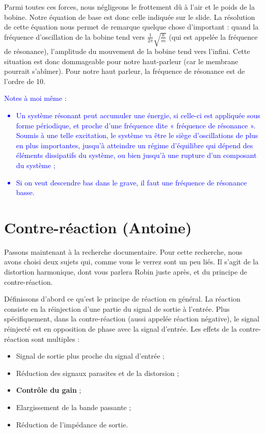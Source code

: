 \documentclass{article}
\begin{document}
Parmi toutes ces forces, nous négligeons le frottement dû à l'air et le poids de la bobine.
Notre équation de base est donc celle indiquée sur le slide. La résolution de cette équation
nous permet de remarque quelque chose d'important : quand la fréquence d'oscillation
de la bobine tend vers $\frac{1}{2\pi} \sqrt{\frac{k}{m}}$ (qui est appelée la fréquence de
résonance), l'amplitude du mouvement de la bobine tend vers l'infini. Cette situation est donc
dommageable pour notre haut-parleur (car le membrane pourrait s'abîmer). Pour notre haut parleur,
la fréquence de résonance est de l'ordre de \unit{10}{\hertz}.

\textcolor{blue}{Notes à moi même : 
\begin{itemize}
	\item Un système résonant peut accumuler une énergie, si celle-ci est appliquée sous
				forme périodique, et proche d'une fréquence dite « fréquence de résonance ». Soumis à une telle
				excitation, le système va être le siège d'oscillations de plus en plus importantes, jusqu'à 
				atteindre un régime d'équilibre qui dépend des éléments dissipatifs du système, ou bien jusqu'à 
				une rupture d'un composant du système ;
	\item Si on veut descendre bas dans le grave, il faut une fréquence de résonance basse.
\end{itemize}}

\section{Contre-réaction (Antoine)}
Passons maintenant à la recherche documentaire. Pour cette recherche, nous avons choisi deux 
sujets qui, comme vous le verrez sont un peu liés. Il s'agit de la distortion harmonique, dont vous
parlera Robin juste après, et du principe de contre-réaction.

Définissons d'abord ce qu'est le principe de réaction en général. La réaction consiste en la réinjection
d'une partie du signal de sortie à l'entrée. Plus spécifiquement, dans la contre-réaction (aussi appelée 
réaction négative), le signal réinjecté est en opposition de phase avec la signal d'entrée. Les effets
de la contre-réaction sont multiples :

\begin{itemize}
	\item Signal de sortie plus proche du signal d'entrée ;
	\item	Réduction des signaux parasites et de la distorsion ;
	\item \textbf{Contrôle du gain} ;
	\item Elargissement de la bande passante ;
	\item Réduction de l'impédance de sortie.
\end{itemize}
\end{document}
